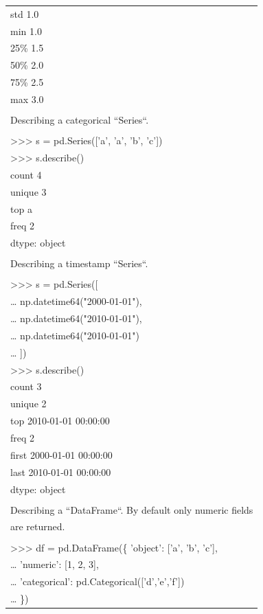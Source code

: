 \documentclass[11pt]{article}
\begin{document}
\begin{enumerate}
\begin{enumerate}
\begin{enumerate}
\begin{center}
\begin{tabular}{l}
std      1.0\\
min      1.0\\
25\%      1.5\\
50\%      2.0\\
75\%      2.5\\
max      3.0\\
\\
Describing a categorical ``Series``.\\
\\
>>> s = pd.Series(['a', 'a', 'b', 'c'])\\
>>> s.describe()\\
count     4\\
unique    3\\
top       a\\
freq      2\\
dtype: object\\
\\
Describing a timestamp ``Series``.\\
\\
>>> s = pd.Series([\\
\ldots{}   np.datetime64("2000-01-01"),\\
\ldots{}   np.datetime64("2010-01-01"),\\
\ldots{}   np.datetime64("2010-01-01")\\
\ldots{} ])\\
>>> s.describe()\\
count                       3\\
unique                      2\\
top       2010-01-01 00:00:00\\
freq                        2\\
first     2000-01-01 00:00:00\\
last      2010-01-01 00:00:00\\
dtype: object\\
\\
Describing a ``DataFrame``. By default only numeric fields\\
are returned.\\
\\
>>> df = pd.DataFrame(\{ 'object': ['a', 'b', 'c'],\\
\ldots{}                     'numeric': [1, 2, 3],\\
\ldots{}                     'categorical': pd.Categorical(['d','e','f'])\\
\ldots{}                   \})\\

\end{tabular}
\end{center}
\end{enumerate}
\end{enumerate}
\end{enumerate}
\end{document}

